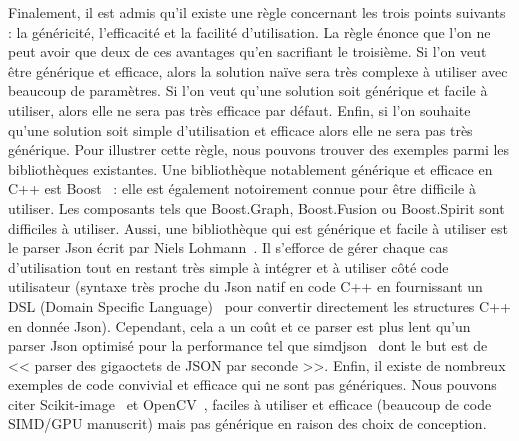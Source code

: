 Finalement, il est admis qu'il existe une règle concernant les trois points suivants : la généricité, l'efficacité et la
facilité d'utilisation. La règle énonce que l'on ne peut avoir que deux de ces avantages qu'en sacrifiant le troisième.
Si l'on veut être générique et efficace, alors la solution naïve sera très complexe à utiliser avec beaucoup de
paramètres. Si l'on veut qu'une solution soit générique et facile à utiliser, alors elle ne sera pas très efficace par
défaut. Enfin, si l'on souhaite qu'une solution soit simple d'utilisation et efficace alors elle ne sera pas très
générique. Pour illustrer cette règle, nous pouvons trouver des exemples parmi les bibliothèques existantes. Une
bibliothèque notablement générique et efficace en C++ est Boost~\parencite{boost.2021} : elle est également notoirement
connue pour être difficile à utiliser. Les composants tels que Boost.Graph, Boost.Fusion ou Boost.Spirit sont difficiles
à utiliser. Aussi, une bibliothèque qui est générique et facile à utiliser est le parser Json écrit par Niels
Lohmann~\parencite{nlohmann.2021.json}. Il s'efforce de gérer chaque cas d'utilisation tout en restant très simple à
intégrer et à utiliser côté code utilisateur (syntaxe très proche du Json natif en code C++ en fournissant un DSL
(Domain Specific Language)~\parencite{deursen.2000.DSL} pour convertir directement les structures C++ en donnée Json).
Cependant, cela a un coût et ce parser est plus lent qu'un parser Json optimisé pour la performance tel que
simdjson~\parencite{lemire.2021.simdjson} dont le but est de << parser des gigaoctets de JSON par seconde >>. Enfin, il
existe de nombreux exemples de code convivial et efficace qui ne sont pas génériques. Nous pouvons citer
Scikit-image~\parencite{vanderwalt.2014.skimage} et OpenCV~\parencite{bradski.2000.opencv}, faciles à utiliser et
efficace (beaucoup de code SIMD/GPU manuscrit) mais pas générique en raison des choix de conception.

